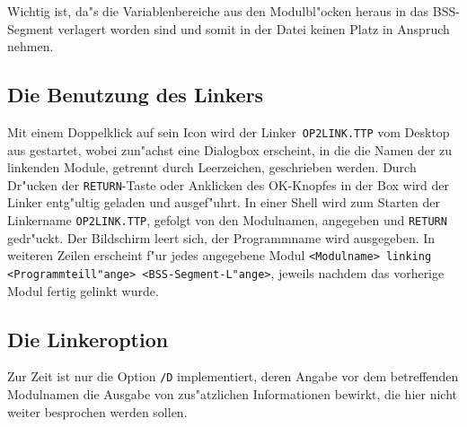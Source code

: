 Wichtig ist, da"s die Variablenbereiche aus den Modulbl"ocken heraus in
das BSS-Segment verlagert worden sind und somit in der Datei keinen Platz
in Anspruch nehmen.

\subsection{Die Benutzung des Linkers}
Mit einem Doppelklick auf sein Icon wird der Linker~{\tt OP2LINK.TTP}
vom Desktop aus gestartet, wobei zun"achst eine Dialogbox erscheint,
in die die Namen der zu linkenden Module, getrennt durch Leerzeichen,
geschrieben werden.
Durch Dr"ucken der {\tt RETURN}-Taste oder Anklicken des OK-Knopfes in der
Box wird der Linker entg"ultig geladen und ausgef"uhrt.
In einer Shell wird zum Starten der Linkername {\tt OP2LINK.TTP}, gefolgt
von den Modulnamen, angegeben und {\tt RETURN} gedr"uckt.
Der Bildschirm leert sich, der Programmname wird ausgegeben.
In weiteren Zeilen erscheint f"ur jedes angegebene Modul {\tt <Modulname>
linking <Programmteill"ange> <BSS-Segment-L"ange>}, jeweils nachdem das
vorherige Modul fertig gelinkt wurde.


\subsection{Die Linkeroption}

Zur Zeit ist nur die Option {\tt /D} implementiert, deren Angabe vor
dem betreffenden Modulnamen die Ausgabe von zus"atzlichen Informationen
bewirkt, die hier nicht weiter besprochen werden sollen.

\newpage
{}
\tableofcontents


